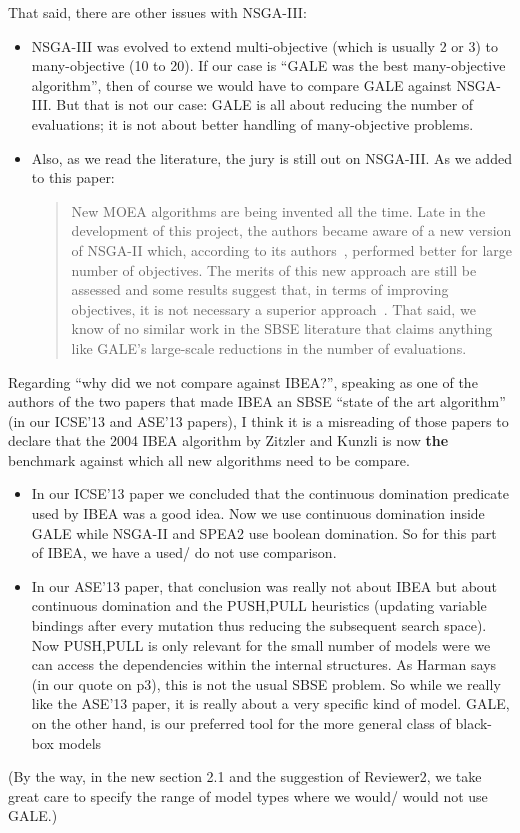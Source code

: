\documentclass[10pt,journal,compsoc]{IEEEtran}
\newcommand{\bi}{\begin{itemize}}
\newcommand{\ei}{\end{itemize}}
\begin{document}
That said, there are other issues with NSGA-III:
\bi
\item
NSGA-III was evolved to extend multi-objective (which is usually 2 or 3) to many-objective (10 to 20). If our case is ``GALE was the best many-objective algorithm'', then of course we would have to compare GALE against NSGA-III.
But that is not our case:
GALE is all about reducing the number of evaluations;
it is not about  better handling of many-objective problems.
\item Also,  as we read the literature, the jury is still out on NSGA-III. As we added to this paper:
\begin{quote}
New MOEA  algorithms are being invented all the time.
Late in the development of this project, the authors became
aware of a new version of NSGA-II which, according to its
authors~\cite{6600851}, performed better for large number of objectives.
The merits of this new approach are still be assessed and some
results suggest that, in terms of improving objectives, it is not necessary a superior approach~\cite{sato14}. That said, we know of no similar work
in the SBSE literature that claims anything like GALE's large-scale
reductions in the number
of evaluations.
\end{quote}
\ei
Regarding ``why  did we not compare against IBEA?'',
speaking as one of the authors of the two papers that made IBEA an SBSE ``state of the art algorithm'' (in our ICSE’13 and ASE’13 papers), I think it is a misreading of those papers to declare that the 2004  IBEA algorithm by Zitzler and   Kunzli is now {\bf the} benchmark against which all new algorithms need to be compare. 
\bi
\item
In our ICSE’13 paper we concluded that the continuous domination predicate used by IBEA was a good idea. Now we use continuous domination inside GALE while NSGA-II and SPEA2 use boolean domination.
So for this part of IBEA, we have a used/ do not use comparison.
\item
In our ASE’13 paper, that conclusion was really not about IBEA but about continuous domination and the  PUSH,PULL heuristics   (updating variable bindings after every mutation thus reducing the subsequent search space). Now PUSH,PULL is only relevant for the small number of models were we can access
the dependencies within the internal structures. As Harman says (in our quote on p3), this is not the usual SBSE problem. So while we really like the ASE'13 paper, it is really about a very specific
kind of model.  GALE, on the other hand, is our preferred tool for the more general class of black-box
models
\ei
(By the way, in the new section 2.1 and the suggestion of Reviewer2,  we take great care to specify the range of model types
where we would/ would not use GALE.)
\end{document}
